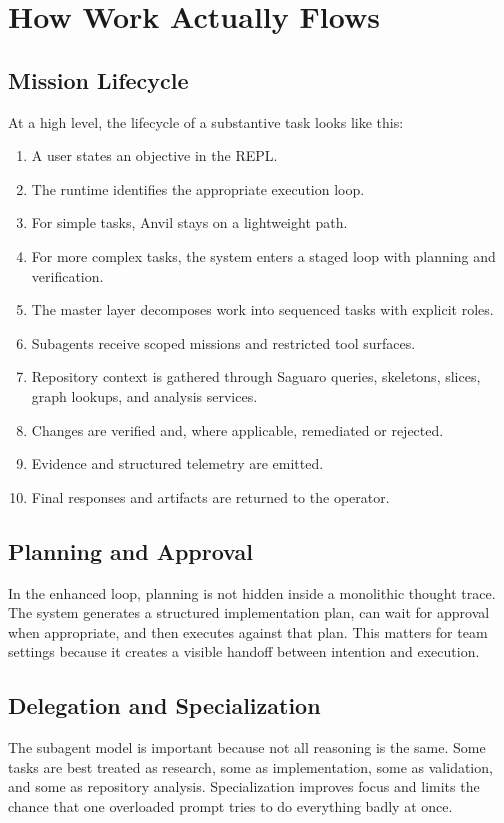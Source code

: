 \documentclass[11pt,a4paper]{article}
\begin{document}
\section{How Work Actually Flows}
\subsection{Mission Lifecycle}
At a high level, the lifecycle of a substantive task looks like this:
\begin{enumerate}
    \item A user states an objective in the REPL.
    \item The runtime identifies the appropriate execution loop.
    \item For simple tasks, Anvil stays on a lightweight path.
    \item For more complex tasks, the system enters a staged loop with planning and verification.
    \item The master layer decomposes work into sequenced tasks with explicit roles.
    \item Subagents receive scoped missions and restricted tool surfaces.
    \item Repository context is gathered through Saguaro queries, skeletons, slices, graph lookups, and analysis services.
    \item Changes are verified and, where applicable, remediated or rejected.
    \item Evidence and structured telemetry are emitted.
    \item Final responses and artifacts are returned to the operator.
\end{enumerate}

\subsection{Planning and Approval}
In the enhanced loop, planning is not hidden inside a monolithic thought trace. The system generates a structured implementation plan, can wait for approval when appropriate, and then executes against that plan. This matters for team settings because it creates a visible handoff between intention and execution.

\subsection{Delegation and Specialization}
The subagent model is important because not all reasoning is the same. Some tasks are best treated as research, some as implementation, some as validation, and some as repository analysis. Specialization improves focus and limits the chance that one overloaded prompt tries to do everything badly at once.
\end{document}
